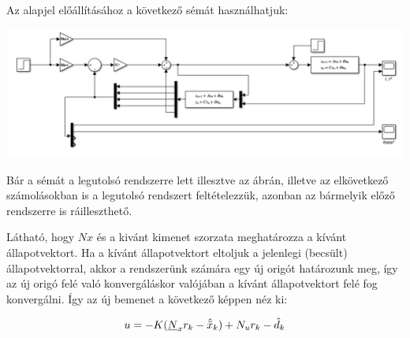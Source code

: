 \documentclass{article}
\begin{document}
    Az alapjel előállításához a következő sémát használhatjuk:
    \begin{center}
        \includegraphics[width=\linewidth]{asset/N.png}
    \end{center}
    Bár a sémát a legutolsó rendszerre lett illesztve az ábrán, illetve az elkövetkező számolásokban is a legutolsó rendszert feltételezzük, azonban az bármelyik előző rendszerre is ráilleszthető.

    Látható, hogy $Nx$ és a kivánt kimenet szorzata meghatározza a kívánt állapotvektort. Ha a kívánt állapotvektort eltoljuk a jelenlegi (becsült) állapotvektorral, akkor a rendszerünk számára egy új origót határozunk meg, így az új origó felé való konvergáláskor valójában a kívánt állapotvektort felé fog konvergálni. %
    Így az új bemenet a következő képpen néz ki:

    \newcommand{\nx}{\vec{N}_x}
    \begin{align}
        u = -K(\nx r_k - \hat{\tx}_k) + N_u r_k - \hat{d}_k
    \end{align}
\end{document}
